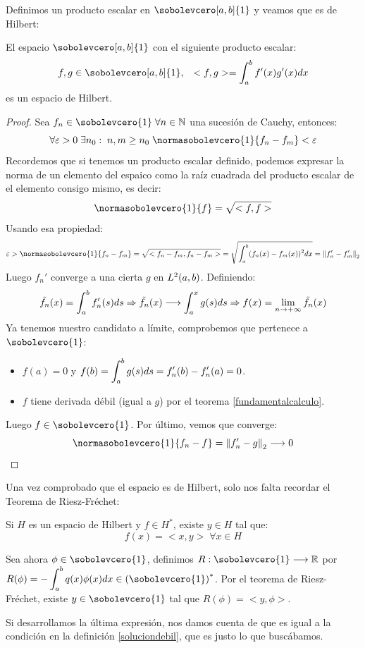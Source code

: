 Definimos un producto escalar en $\sobolevcero[a,b]{1}$ y veamos que es de Hilbert:
\begin{prop}
El espacio $\sobolevcero[a,b]{1}$ con el siguiente producto escalar:
\[
f,g\in\sobolevcero[a,b]{1}, \espacio <f,g>=\integral{a}{b}{f'(x)g'(x)dx}
\]
es un espacio de Hilbert.
\end{prop}
\begin{proof}
Sea $f_n\in\sobolevcero{1} \;\forall n\in\N$ una sucesión de Cauchy, entonces:
\[
\forall \varepsilon>0 \; \exists n_0: \; n,m\geq n_0 \; \normasobolevcero{1}{f_n-f_m}<\varepsilon
\]
Recordemos que si tenemos un producto escalar definido, podemos expresar la norma de un elemento del espaico como la raíz cuadrada del producto escalar de el elemento consigo mismo, es decir:
\[
\normasobolevcero{1}{f}=\sqrt{<f,f>}
\]
Usando esa propiedad:
\[
\varepsilon > \normasobolevcero{1}{f_n-f_m}=\sqrt{<f_n-f_m,f_n-f_m>}=\sqrt{\integral{a}{b}{(f_n(x)-f_m(x))^2dx}}=\norm{f_n'-f_m'}_2
\]
Luego $f_n'$ converge a una cierta $g$ en $L^{ 2 }(a,b)$. Definiendo:
\[
\tilde{f_n}(x)=\displaystyle\int_{ a }^{ b } f_n'(s)ds \Rightarrow \tilde{f_n}(x) \longrightarrow \displaystyle\int_{ a }^{ x } g(s)ds \Rightarrow f(x) = \displaystyle\lim_{  n  \to +\infty }  \tilde{f_n}(x) 
\]
Ya tenemos nuestro candidato a límite, comprobemos que pertenece a $\sobolevcero{1}$:
\begin{itemize}
\item $f(a)=0$ y $f(b)=\displaystyle\int_{ a }^{ b } g(s)ds=f_n'(b)-f_n'(a)=0$.
\item $f$ tiene derivada débil (igual a $g$) por el teorema \ref{fundamentalcalculo}.
\end{itemize}
Luego $f\in\sobolevcero{1}$.
Por último, vemos que converge:
\[
\normasobolevcero{1}{f_n-f}=\norm{f_n'-g}_2\longrightarrow 0
\]
\end{proof}

Una vez comprobado que el espacio es de Hilbert, solo nos falta recordar el Teorema de Riesz-Fréchet:
\begin{theorem}
\label{riesz-frechet}
Si $H$ es un espacio de Hilbert y $f\in H^*$, existe $y\in H$ tal que:
\[
f(x)=<x,y> \; \forall x\in H
\]
\end{theorem}

Sea ahora $\phi\in\sobolevcero{1}$, definimos $\funcion{R}{\sobolevcero{1}}{\R}$ por $R(\phi)=-\integral{a}{b}{q(x)\phi(x)dx}\in\left(\sobolevcero{1}\right)^*$. Por el teorema de Riesz-Fréchet, existe $y\in\sobolevcero{1}$ tal que $R(\phi)=<y,\phi>$.

Si desarrollamos la última expresión, nos damos cuenta de que es igual a la condición en la definición \ref{soluciondebil}, que es justo lo que buscábamos.

